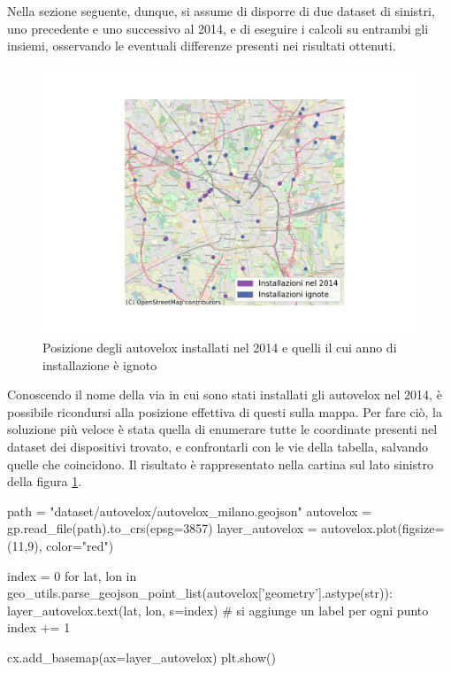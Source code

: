 \documentclass[a4paper]{report}
\begin{document}
Nella sezione seguente, dunque, si assume di disporre di due dataset di sinistri, uno 
precedente e uno successivo al 2014, e di eseguire i calcoli su entrambi gli insiemi, 
osservando le eventuali differenze presenti nei risultati ottenuti.

\begin{figure}
    \includegraphics[width=\linewidth]{../src/autovelox/autovelox_2014.png}
    \caption{Posizione degli autovelox installati nel 2014 e quelli il cui 
    anno di installazione è ignoto}
    \label{fig:autovelox-indici}
\end{figure}

Conoscendo il nome della via in cui sono stati installati gli autovelox nel 2014, 
è possibile ricondursi alla posizione effettiva di questi sulla mappa. 
Per fare ciò, la soluzione più veloce è stata quella di enumerare tutte le coordinate presenti 
nel dataset dei dispositivi trovato, 
e confrontarli con le vie della tabella, salvando quelle che coincidono. 
Il risultato è rappresentato nella cartina sul lato sinistro della 
figura \ref{fig:autovelox-indici}. 

\begin{code}[language=Python]
path = "dataset/autovelox/autovelox_milano.geojson"
autovelox = gp.read_file(path).to_crs(epsg=3857)
layer_autovelox = autovelox.plot(figsize=(11,9), color="red")
    
index = 0
for lat, lon in geo_utils.parse_geojson_point_list(autovelox['geometry'].astype(str)):
    layer_autovelox.text(lat, lon, s=index)
    # si aggiunge un label per ogni punto
    index += 1
    
cx.add_basemap(ax=layer_autovelox)
plt.show()
\end{code}
\end{document}
